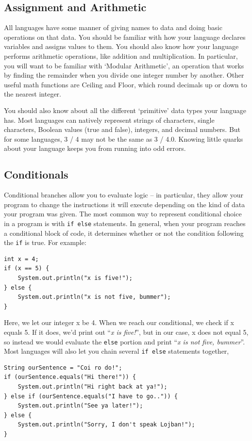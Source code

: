 \documentclass[a4paper]{article}
\begin{document}
\subsection{Assignment and Arithmetic}
All languages have some manner of giving names to data and doing basic operations on that data. You should be familiar with how your language declares variables and assigns values to them. You should also know how your language performs arithmetic operations, like addition and multiplication. In particular, you will want to be familiar with `Modular Arithmetic', an operation that works by finding the remainder when you divide one integer number by another. Other useful math functions are Ceiling and Floor, which round decimals up or down to the nearest integer.

You should also know about all the different `primitive' data types your language has. Most languages can natively represent strings of characters, single characters, Boolean values (true and false), integers, and decimal numbers. But for some languages, 3 / 4 may not be the same as 3 / 4.0. Knowing little quarks about your language keeps you from running into odd errors.

\subsection{Conditionals}
Conditional branches allow you to evaluate logic -- in particular, they allow your program to change the instructions it will execute depending on the kind of data your program was given. The most common way to represent conditional choice in a program is with \texttt{if else} statements. In general, when your program reaches a conditional block of code, it determines whether or not the condition following the \texttt{if} is true. For example:

\begin{lstlisting}
int x = 4;
if (x == 5) {
    System.out.println("x is five!");
} else {
    System.out.println("x is not five, bummer");
}
\end{lstlisting}

Here, we let our integer x be 4. When we reach our conditional, we check if x equals 5. If it does, we'd print out ``\textit{x is five!}'', but in our case, x does not equal 5, so instead we would evaluate the \texttt{else} portion and print ``\textit{x is not five, bummer}''. Most languages will also let you chain several \texttt{if else} statements together,

\begin{lstlisting}
String ourSentence = "Coi ro do!";
if (ourSentence.equals("Hi there!")) {
    System.out.println("Hi right back at ya!");
} else if (ourSentence.equals("I have to go..")) {
    System.out.println("See ya later!");
} else {
    System.out.println("Sorry, I don't speak Lojban!");
}
\end{lstlisting}
\end{document}
